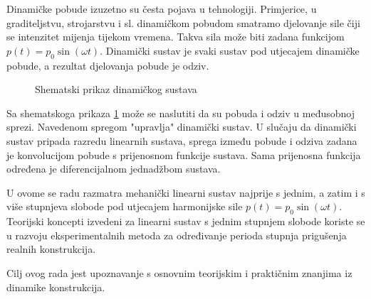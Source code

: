 Dinamičke pobude izuzetno su česta pojava u tehnologiji. Primjerice, u
graditeljstvu, strojarstvu i sl. dinamičkom pobudom smatramo djelovanje sile
čiji se intenzitet mijenja tijekom vremena. Takva sila može biti zadana funkcijom
$p(t) = p_0 \sin(\omega t)$. Dinamički sustav je svaki sustav pod utjecajem dinamičke pobude, a 
rezultat djelovanja pobude je odziv. 

\begin{figure}[H]
    \begin{subfigure}{0.3\textwidth}
        
    \end{subfigure}
    \hskip 1pt
    \begin{subfigure}{0.3\textwidth}
        
    \end{subfigure}
    \hskip 1pt
    \begin{subfigure}{0.3\textwidth}
        
    \end{subfigure}
    \caption{Shematski prikaz dinamičkog sustava}
    \label{fig:shematski_prikaz_sustava}
\end{figure}

Sa shematskoga prikaza \ref{fig:shematski_prikaz_sustava} može se naslutiti da su pobuda 
i odziv u međusobnoj sprezi. Navedenom spregom "upravlja" dinamički sustav. U slučaju da 
dinamički sustav pripada razredu linearnih sustava, sprega između pobude i odziva zadana 
je konvolucijom pobude s prijenosnom funkcije sustava. Sama prijenosna funkcija određena 
je diferencijalnom jednadžbom sustava. 
\par

%

U ovome se radu razmatra mehanički linearni sustav najprije s jednim, a
zatim i s više stupnjeva slobode pod utjecajem harmonijske sile $p(t) = p_0 \sin(\omega t)$. 
Teorijski koncepti izvedeni za linearni sustav s jednim stupnjem slobode koriste se  
u razvoju eksperimentalnih metoda za određivanje perioda stupnja prigušenja realnih 
konstrukcija. 
\par

Cilj ovog rada jest upoznavanje s osnovnim teorijskim i praktičnim znanjima iz
dinamike konstrukcija. 

